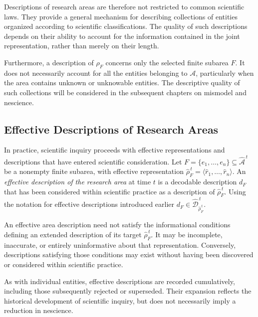 Descriptions of research areas are therefore not restricted to common scientific laws. They provide a general mechanism for describing collections of entities organized according to scientific classifications. The quality of such descriptions depends on their ability to account for the information contained in the joint representation, rather than merely on their length.

Furthermore, a description of $\rho_F$ concerns only the selected finite subarea $F$. It does not necessarily account for all the entities belonging to $\mathcal{A}$, particularly when the area contains unknown or unknowable entities. The descriptive quality of such collections will be considered in the subsequent chapters on mismodel and nescience.


\subsection*{Effective Descriptions of Research Areas}

In practice, scientific inquiry proceeds with effective representations and descriptions that have entered scientific consideration. Let $F=\{e_1,\ldots,e_n\}\subseteq \hat{\mathcal{A}}^{\,t}$ be a nonempty finite subarea, with effective representation $\hat{\rho}_F^{\,t} = \langle\hat r_1,\ldots,\hat r_n\rangle$. An \emph{effective description of the research area} at time $t$ is a decodable description $d_F$ that has been considered within scientific practice as a  description of $\hat{\rho}_F^{\,t}$. Using the notation for effective descriptions introduced earlier $d_F \in \hat{\mathcal{D}}_{\hat{\rho}_F^{\,t}}^{\,t}$.

An effective area description need not satisfy the informational conditions defining an extended description of its target $\hat\rho_F^{\,t}$. It may be incomplete, inaccurate, or entirely uninformative about that representation. Conversely, descriptions satisfying those conditions may exist without having been discovered or considered within scientific practice.

As with individual entities, effective descriptions are recorded cumulatively, including those subsequently rejected or superseded. Their expansion reflects the historical development of scientific inquiry, but does not necessarily imply a reduction in nescience.

